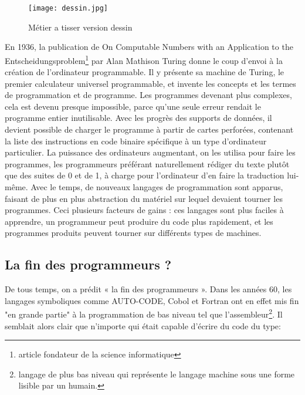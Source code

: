 \documentclass[12pt,a4paper]{article}
\begin{document}
    
    \begin{figure}[ht]
        \centering
        \texttt{[image: dessin.jpg]}
        \caption{Métier a tisser version dessin}
        \label{fig:Métier a tisser version dessin}
    \end{figure}
    
    
    En 1936, la publication de On Computable Numbers with an Application to the Entscheidungsproblem\cite{livre2}\footnote{article fondateur de la  science informatique} par Alan Mathison Turing donne le coup  d'envoi à la  création de l'ordinateur programmable. Il y présente sa machine de  Turing, le premier calculateur universel programmable, et invente les concepts et les termes de programmation et de programme. Les programmes devenant plus complexes, cela est devenu presque  impossible, parce qu'une seule erreur rendait le programme entier  inutilisable. Avec les progrès des supports de données, il devient possible de charger le programme à partir de cartes perforées, contenant la liste des instructions en code binaire spécifique à un type d'ordinateur particulier. La puissance des ordinateurs augmentant, on les utilisa pour faire les programmes, les programmeurs préférant naturellement rédiger du texte plutôt que des suites de 0 et de 1, à charge pour l'ordinateur d'en faire la traduction lui-même. Avec le temps, de nouveaux langages de programmation sont apparus, faisant de plus en plus abstraction du matériel sur lequel devaient tourner les programmes. Ceci plusieurs facteurs de gains : ces langages sont plus faciles à apprendre, un programmeur peut produire du code plus rapidement, et les programmes produits peuvent tourner sur différents types de machines.
    
    
    \subsection{La fin des programmeurs ?}
    De tous temps, on a prédit « la fin des programmeurs ». Dans les années 60, les langages symboliques comme AUTO-CODE, Cobol et Fortran ont  en effet mis fin "en grande partie" à la programmation de bas niveau tel que l'assembleur\footnote{langage de plus bas niveau qui représente le langage machine sous une forme lisible par un humain.}. Il semblait alors clair que n'importe qui était capable d'écrire du code du type:
\end{document}

